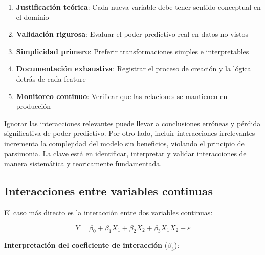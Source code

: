 \documentclass[
  letterpaper,
  DIV=11,
  numbers=noendperiod]{scrreprt}
\providecommand{\tightlist}{%
  \setlength{\itemsep}{0pt}\setlength{\parskip}{0pt}}
\begin{document}
\begin{tcolorbox}[enhanced jigsaw, leftrule=.75mm, breakable, colbacktitle=quarto-callout-important-color!10!white, bottomrule=.15mm, colframe=quarto-callout-important-color-frame, toprule=.15mm, colback=white, coltitle=black, bottomtitle=1mm, left=2mm, title=\textcolor{quarto-callout-important-color}{\faExclamation}\hspace{0.5em}{Principios para feature engineering efectivo}, opacityback=0, arc=.35mm, opacitybacktitle=0.6, toptitle=1mm, titlerule=0mm, rightrule=.15mm]

\begin{enumerate}
\def\labelenumi{\arabic{enumi}.}
\tightlist
\item
  \textbf{Justificación teórica}: Cada nueva variable debe tener sentido
  conceptual en el dominio
\item
  \textbf{Validación rigurosa}: Evaluar el poder predictivo real en
  datos no vistos
\item
  \textbf{Simplicidad primero}: Preferir transformaciones simples e
  interpretables
\item
  \textbf{Documentación exhaustiva}: Registrar el proceso de creación y
  la lógica detrás de cada feature
\item
  \textbf{Monitoreo continuo}: Verificar que las relaciones se mantienen
  en producción
\end{enumerate}

\end{tcolorbox}

Ignorar las interacciones relevantes puede llevar a conclusiones
erróneas y pérdida significativa de poder predictivo. Por otro lado,
incluir interacciones irrelevantes incrementa la complejidad del modelo
sin beneficios, violando el principio de parsimonia. La clave está en
identificar, interpretar y validar interacciones de manera sistemática y
teoricamente fundamentada.

\subsection{Interacciones entre variables
continuas}\label{interacciones-entre-variables-continuas}

El caso más directo es la interacción entre dos variables continuas:

\[Y = \beta_0 + \beta_1 X_1 + \beta_2 X_2 + \beta_3 X_1 X_2 + \varepsilon\]

\textbf{Interpretación del coeficiente de interacción} (\(\beta_3\)):
\end{document}
